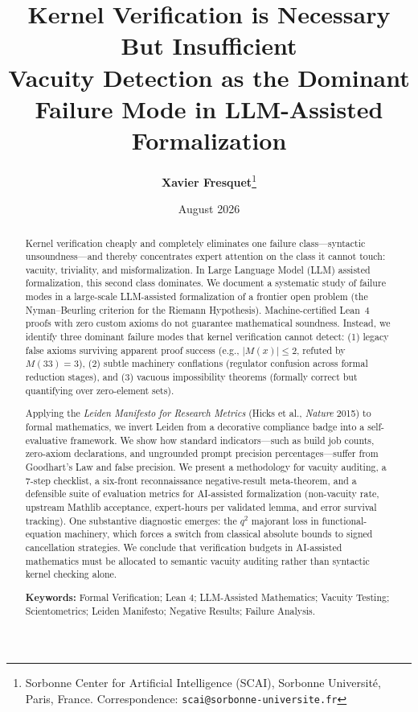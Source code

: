\documentclass[11pt,a4paper]{article}
\title{\textbf{Kernel Verification is Necessary But Insufficient}\\[0.5em]
\large Vacuity Detection as the Dominant Failure Mode in LLM-Assisted Formalization}
\author{\textbf{Xavier Fresquet}\thanks{Sorbonne Center for Artificial Intelligence (SCAI), Sorbonne Universit\'e, Paris, France. Correspondence: \texttt{scai@sorbonne-universite.fr}}}
\date{August 2026}
\theoremstyle{definition}
\theoremstyle{remark}
\begin{document}
\maketitle

\begin{abstract}
Kernel verification cheaply and completely eliminates one failure class---syntactic unsoundness---and thereby concentrates expert attention on the class it cannot touch: vacuity, triviality, and misformalization. In Large Language Model (LLM) assisted formalization, this second class dominates. We document a systematic study of failure modes in a large-scale LLM-assisted formalization of a frontier open problem (the Nyman--Beurling criterion for the Riemann Hypothesis). Machine-certified Lean~4 proofs with zero custom axioms do not guarantee mathematical soundness. Instead, we identify three dominant failure modes that kernel verification cannot detect: (1) legacy false axioms surviving apparent proof success (e.g., $|M(x)| \le 2$, refuted by $M(33)=3$), (2) subtle machinery conflations (regulator confusion across formal reduction stages), and (3) vacuous impossibility theorems (formally correct but quantifying over zero-element sets).

Applying the \emph{Leiden Manifesto for Research Metrics} (Hicks et al., \emph{Nature} 2015) to formal mathematics, we invert Leiden from a decorative compliance badge into a self-evaluative framework. We show how standard indicators---such as build job counts, zero-axiom declarations, and ungrounded prompt precision percentages---suffer from Goodhart's Law and false precision. We present a methodology for vacuity auditing, a 7-step checklist, a six-front reconnaissance negative-result meta-theorem, and a defensible suite of evaluation metrics for AI-assisted formalization (non-vacuity rate, upstream Mathlib acceptance, expert-hours per validated lemma, and error survival tracking). One substantive diagnostic emerges: the $q^2$ majorant loss in functional-equation machinery, which forces a switch from classical absolute bounds to signed cancellation strategies. We conclude that verification budgets in AI-assisted mathematics must be allocated to semantic vacuity auditing rather than syntactic kernel checking alone.

\textbf{Keywords:} Formal Verification; Lean 4; LLM-Assisted Mathematics; Vacuity Testing; Scientometrics; Leiden Manifesto; Negative Results; Failure Analysis.
\end{abstract}

\end{document}
